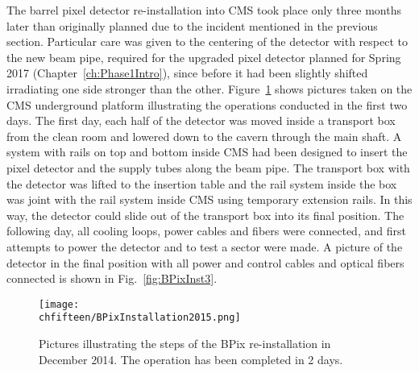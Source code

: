The barrel pixel detector re-installation into CMS took place only three months later than originally planned due to the incident mentioned in the previous section. 
Particular care was given to the centering of the detector with respect to the new beam pipe, required for the upgraded pixel detector planned for Spring 2017 (Chapter~\ref{ch:Phase1Intro}),
since before it had been slightly shifted irradiating one side stronger than the other.
Figure~\ref{fig:BPixInst2} shows pictures taken on the CMS underground platform illustrating the operations conducted in the first two days.
The first day, each half of the detector was moved inside a transport box from the clean room and lowered down to the cavern through the main shaft.
A system with rails on top and bottom inside CMS had been designed to insert the pixel detector and the supply tubes along the beam pipe.
The transport box with the detector was lifted to the insertion table and the rail system inside the box was joint with the rail system inside CMS using temporary extension rails.
In this way, the detector could slide out of the transport box into its final position.
The following day, all cooling loops, power cables and fibers were connected, and first attempts to power the detector and to test a sector were made.
A picture of the detector in the final position with all power and control cables and optical fibers connected is shown in Fig.~\ref{fig:BPixInst3}.

\begin{figure}[!htb]
 \begin{center}
 \texttt{[image: \\chfifteen/BPixInstallation2015.png]}
 \end{center}
 \caption{Pictures illustrating the steps of the BPix re-installation in December 2014. The operation has been completed in 2 days.}
 \label{fig:BPixInst2}
\end{figure}

